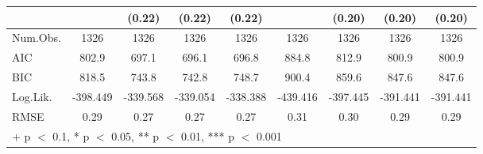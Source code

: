 \begin{table}
\begin{tabular}[t]{lcccccccc}
 &  & (0.22) & (0.22) & (0.22) &  & (0.20) & (0.20) & (0.20)\\
\midrule
Num.Obs. & 1326 & 1326 & 1326 & 1326 & 1326 & 1326 & 1326 & 1326\\
AIC & 802.9 & 697.1 & 696.1 & 696.8 & 884.8 & 812.9 & 800.9 & 800.9\\
BIC & 818.5 & 743.8 & 742.8 & 748.7 & 900.4 & 859.6 & 847.6 & 847.6\\
Log.Lik. & -398.449 & -339.568 & -339.054 & -338.388 & -439.416 & -397.445 & -391.441 & -391.441\\
RMSE & 0.29 & 0.27 & 0.27 & 0.27 & 0.31 & 0.30 & 0.29 & 0.29\\
\bottomrule
\multicolumn{9}{l}{\rule{0pt}{1em}+ p $<$ 0.1, * p $<$ 0.05, ** p $<$ 0.01, *** p $<$ 0.001}\\
\end{tabular}
\end{table}
